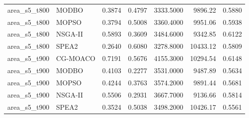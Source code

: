 \begin{longtable}{llrrrrr}
area\_s5\_t800 & MODBO & 0.3874 & 0.4797 & 3333.5000 & 9896.22 & 0.5880 \\
area\_s5\_t800 & MOPSO & 0.3794 & 0.5008 & 3360.4000 & 9951.06 & 0.5938 \\
area\_s5\_t800 & NSGA-II & 0.5893 & 0.3609 & 3484.6000 & 9342.85 & 0.6122 \\
area\_s5\_t800 & SPEA2 & 0.2640 & 0.6080 & 3278.8000 & 10433.12 & 0.5809 \\
area\_s5\_t900 & CG-MOACO & 0.7191 & 0.5676 & 4155.3000 & 10294.54 & 0.6148 \\
area\_s5\_t900 & MODBO & 0.4103 & 0.2277 & 3531.0000 & 9487.89 & 0.5634 \\
area\_s5\_t900 & MOPSO & 0.4244 & 0.3763 & 3574.2000 & 9891.44 & 0.5681 \\
area\_s5\_t900 & NSGA-II & 0.5506 & 0.2931 & 3667.7000 & 9136.66 & 0.5814 \\
area\_s5\_t900 & SPEA2 & 0.3524 & 0.5038 & 3498.2000 & 10426.17 & 0.5561 \\
\bottomrule
\end{longtable}
